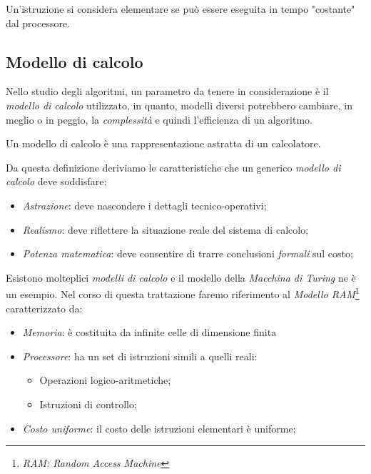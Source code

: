 \begin{definition}
    Un’istruzione si considera elementare se può essere eseguita
    in tempo "costante" dal processore.
\end{definition}

\newpage
\subsection{Modello di calcolo}
Nello studio degli algoritmi, un parametro da tenere in considerazione è il
\emph{modello di calcolo} utilizzato, in quanto, modelli diversi potrebbero
cambiare, in meglio o in peggio, la \emph{complessità} e quindi l'efficienza di
un algoritmo.

\begin{definition}
    Un modello di calcolo è una rappresentazione astratta di un calcolatore.
\end{definition}\noindent
Da questa definizione deriviamo le caratteristiche che un generico \emph{modello
di calcolo} deve soddisfare:
\begin{itemize}
    \item \emph{Astrazione}: deve nascondere i dettagli tecnico-operativi;
    \item \emph{Realismo}: deve riflettere la situazione reale del sistema di
    calcolo;
    \item \emph{Potenza matematica}: deve consentire di trarre conclusioni
    \emph{formali} sul costo;
\end{itemize}
Esistono molteplici \emph{modelli di calcolo} e il modello della \emph{Macchina
di Turing} ne è un esempio. Nel corso di questa trattazione faremo
riferimento al \emph{Modello RAM}\footnote{\emph{RAM: Random Access Machine}}
caratterizzato da:
\begin{itemize}
    \item \emph{Memoria}: è costituita da infinite celle di dimensione finita
    \item \emph{Processore}: ha un set di istruzioni simili a quelli reali:
    \begin{itemize}
        \item Operazioni logico-aritmetiche;
        \item Istruzioni di controllo;
    \end{itemize}
    \item \emph{Costo uniforme}: il costo delle istruzioni elementari è
    uniforme;
\end{itemize}

